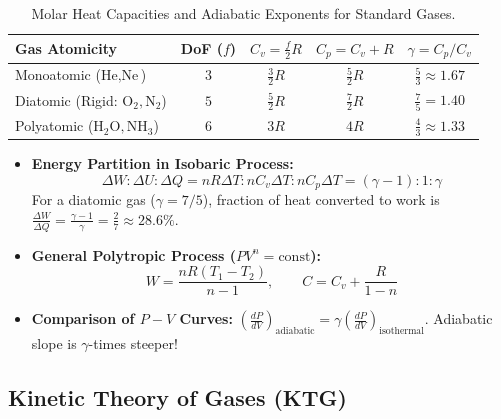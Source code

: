 \documentclass[10pt,twoside,openright]{book}
\begin{document}
\begin{table}[htbp]
\centering
\footnotesize
\setlength{\tabcolsep}{3pt}
\renewcommand{\arraystretch}{1.2}
\begin{tabularx}{\textwidth}{L c c c c}
\toprule
\textbf{Gas Atomicity} & \textbf{DoF ($f$)} & $C_v = \frac{f}{2}R$ & $C_p = C_v + R$ & $\gamma = C_p/C_v$ \\
\midrule
Monoatomic ($\text{He}, \text{Ne}$) & $3$ & $\frac{3}{2}R$ & $\frac{5}{2}R$ & $\frac{5}{3} \approx 1.67$ \\
Diatomic (Rigid: $\text{O}_2, \text{N}_2$) & $5$ & $\frac{5}{2}R$ & $\frac{7}{2}R$ & $\frac{7}{5} = 1.40$ \\
Polyatomic ($\text{H}_2\text{O}, \text{NH}_3$) & $6$ & $3R$ & $4R$ & $\frac{4}{3} \approx 1.33$ \\
\bottomrule
\end{tabularx}
\caption{Molar Heat Capacities and Adiabatic Exponents for Standard Gases.}
\end{table}

\begin{usecasebox}
\begin{itemize}
  \item \textbf{Energy Partition in Isobaric Process:}
  \begin{equation*}
    \Delta W : \Delta U : \Delta Q = nR\Delta T : nC_v\Delta T : nC_p\Delta T = (\gamma - 1) : 1 : \gamma
  \end{equation*}
  For a diatomic gas ($\gamma = 7/5$), fraction of heat converted to work is $\frac{\Delta W}{\Delta Q} = \frac{\gamma - 1}{\gamma} = \frac{2}{7} \approx 28.6\%$.
  \item \textbf{General Polytropic Process ($P V^n = \text{const}$):}
  \begin{equation*}
    W = \frac{nR(T_1 - T_2)}{n - 1}, \qquad C = C_v + \frac{R}{1 - n}
  \end{equation*}
  \item \textbf{Comparison of $P-V$ Curves:} $\left(\frac{dP}{dV}\right)_{\text{adiabatic}} = \gamma\left(\frac{dP}{dV}\right)_{\text{isothermal}}$. Adiabatic slope is $\gamma$-times steeper!
\end{itemize}
\end{usecasebox}

\subsection{Kinetic Theory of Gases (KTG)}
\end{document}
